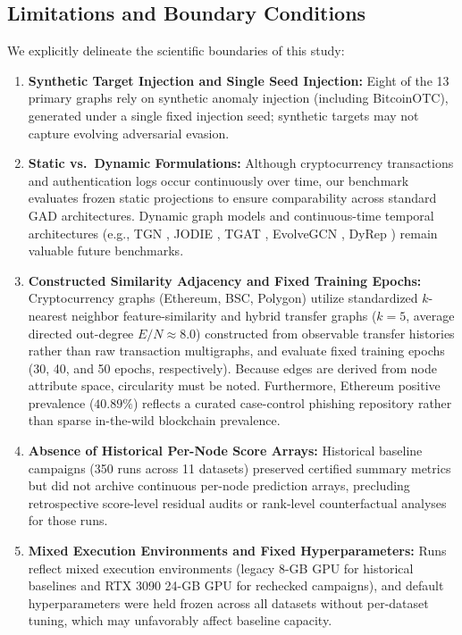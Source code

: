 \documentclass[11pt,a4paper]{article}
\begin{document}
\subsection{Limitations and Boundary Conditions}
We explicitly delineate the scientific boundaries of this study:
\begin{enumerate}
    \item \textbf{Synthetic Target Injection and Single Seed Injection:} Eight of the 13 primary graphs rely on synthetic anomaly injection (including BitcoinOTC), generated under a single fixed injection seed; synthetic targets may not capture evolving adversarial evasion.
    \item \textbf{Static vs.\ Dynamic Formulations:} Although cryptocurrency transactions and authentication logs occur continuously over time, our benchmark evaluates frozen static projections to ensure comparability across standard GAD architectures. Dynamic graph models and continuous-time temporal architectures (e.g., TGN \cite{rossi2020tgn}, JODIE \cite{kumar2019jodie}, TGAT \cite{xu2020tgat}, EvolveGCN \cite{pareja2020evolvegcn}, DyRep \cite{trivedi2019dyrep}) remain valuable future benchmarks.
    \item \textbf{Constructed Similarity Adjacency and Fixed Training Epochs:} Cryptocurrency graphs (Ethereum, BSC, Polygon) utilize standardized $k$-nearest neighbor feature-similarity and hybrid transfer graphs ($k=5$, average directed out-degree $E/N \approx 8.0$) constructed from observable transfer histories rather than raw transaction multigraphs, and evaluate fixed training epochs (30, 40, and 50 epochs, respectively). Because edges are derived from node attribute space, circularity must be noted. Furthermore, Ethereum positive prevalence ($40.89\%$) reflects a curated case-control phishing repository rather than sparse in-the-wild blockchain prevalence.
    \item \textbf{Absence of Historical Per-Node Score Arrays:} Historical baseline campaigns (350 runs across 11 datasets) preserved certified summary metrics but did not archive continuous per-node prediction arrays, precluding retrospective score-level residual audits or rank-level counterfactual analyses for those runs.
    \item \textbf{Mixed Execution Environments and Fixed Hyperparameters:} Runs reflect mixed execution environments (legacy 8-GB GPU for historical baselines and RTX 3090 24-GB GPU for rechecked campaigns), and default hyperparameters were held frozen across all datasets without per-dataset tuning, which may unfavorably affect baseline capacity.

\end{enumerate}
\end{document}
